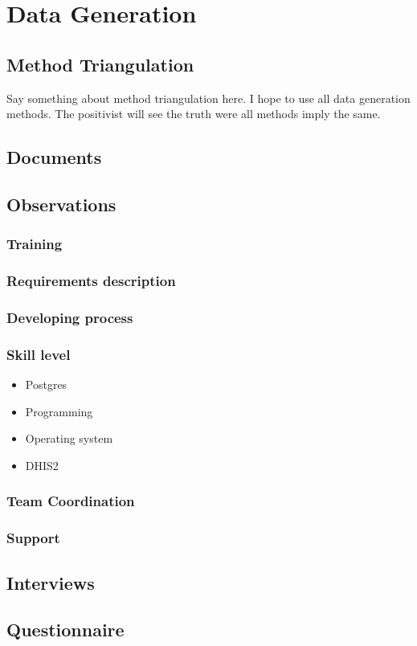 \section{Data Generation}


\subsection{Method Triangulation}
Say something about method triangulation here.
I hope to use all data generation methods.
The positivist will see the truth were all methods imply the same.



\subsection{Documents}

\subsection{Observations}
\subsubsection{Training}
\subsubsection{Requirements description}
\subsubsection{Developing process}
\subsubsection{Skill level}
\begin{itemize}
	\item Postgres
	\item Programming
	\item Operating system
	\item DHIS2
\end{itemize}
\subsubsection{Team Coordination}
\subsubsection{Support}

\subsection{Interviews}

\subsection{Questionnaire}

